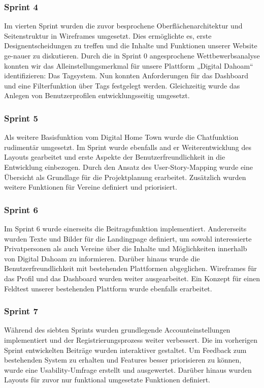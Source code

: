 \subsubsection{Sprint 4}
Im vierten Sprint wurden die zuvor besprochene Oberflächenarchitektur und Seitenstruktur in Wireframes umgesetzt. Dies ermöglichte es, erste Designentscheidungen zu treffen und die Inhalte und Funktionen unserer Website ge-nauer zu diskutieren. Durch die in Sprint 0 angesprochene Wettbewerbsanalyse konnten wir das Alleinstellungsmerkmal für unsere Plattform „Digital Dahoam“ identifizieren: Das Tagsystem. Nun konnten Anforderungen für das Dashboard und eine Filterfunktion über Tags festgelegt werden. Gleichzeitig wurde das Anlegen von Benutzerprofilen entwicklungsseitig umgesetzt.

\subsubsection{Sprint 5}
Als weitere Basisfunktion vom Digital Home Town wurde die Chatfunktion rudimentär umgesetzt. Im Sprint wurde ebenfalls and er Weiterentwicklung des Layouts gearbeitet und erste Aspekte der Benutzerfreundlichkeit in die Entwicklung einbezogen. Durch den Ansatz des User-Story-Mapping wurde eine Übersicht als Grundlage für die Projektplanung erarbeitet. Zusätzlich wurden weitere Funktionen für Vereine definiert und priorisiert.

\subsubsection{Sprint 6}
Im Sprint 6 wurde einerseits die Beitragsfunktion implementiert. Andererseits wurden Texte und Bilder für die Landingpage definiert, um sowohl interessierte Privatpersonen als auch Vereine über die Inhalte und Möglichkeiten innerhalb von Digital Dahoam zu informieren. Darüber hinaus wurde die Benutzerfreundlichkeit mit bestehenden Plattformen abgeglichen. Wireframes für das Profil und das Dashboard wurden weiter ausgearbeitet. Ein Konzept für einen Feldtest unserer bestehenden Plattform wurde ebenfalls erarbeitet.

\subsubsection{Sprint 7}
Während des siebten Sprints wurden grundlegende Accounteinstellungen implementiert und der Registrierungsprozess weiter verbessert. Die im vorherigen Sprint entwickelten Beiträge wurden interaktiver gestaltet. Um Feedback zum bestehenden System zu erhalten und Features besser priorisieren zu können, wurde eine Usability-Umfrage erstellt und ausgewertet. Darüber hinaus wurden Layouts für zuvor nur funktional umgesetzte Funktionen definiert.

